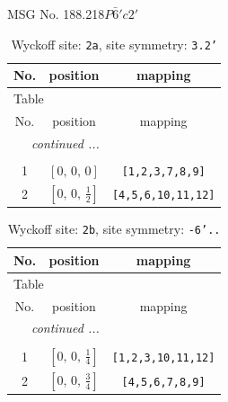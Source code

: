 \documentclass[fleqn,8pt]{jsarticle}
\begin{document}
\setcounter{MaxMatrixCols}{32}

\renewcommand{\tablename}{Table~}
\renewcommand{\figurename}{Figure~}
\begin{center}
\LARGE
MSG No. 188.218\quad$P\bar{6}'c2'$
\end{center}
\renewcommand{\arraystretch}{1.2}
\begin{longtable}{ccc}
\caption{Wyckoff site: {\tt 2a}, site symmetry: {\tt 3.2'}}
 \\
 \hline \hline
No. & position & mapping \\ \hline \endfirsthead

\multicolumn{2}{l}{\tablename\ \thetable{}} \\
 \hline \hline
No. & position & mapping \\ \hline \endhead

 \hline \hline
\multicolumn{2}{r}{\footnotesize\it continued ...} \\ \endfoot

 \hline \hline
\multicolumn{2}{r}{} \\ \endlastfoot

1 & $\left[ 0,\, 0,\, 0 \right]$ & {\tt [1,2,3,7,8,9]} \\ \hline
2 & $\left[ 0,\, 0,\, \frac{1}{2} \right]$ & {\tt [4,5,6,10,11,12]} \\
\end{longtable}
\renewcommand{\arraystretch}{1.2}
\begin{longtable}{ccc}
\caption{Wyckoff site: {\tt 2b}, site symmetry: {\tt -6'..}}
 \\
 \hline \hline
No. & position & mapping \\ \hline \endfirsthead

\multicolumn{2}{l}{\tablename\ \thetable{}} \\
 \hline \hline
No. & position & mapping \\ \hline \endhead

 \hline \hline
\multicolumn{2}{r}{\footnotesize\it continued ...} \\ \endfoot

 \hline \hline
\multicolumn{2}{r}{} \\ \endlastfoot

1 & $\left[ 0,\, 0,\, \frac{1}{4} \right]$ & {\tt [1,2,3,10,11,12]} \\ \hline
2 & $\left[ 0,\, 0,\, \frac{3}{4} \right]$ & {\tt [4,5,6,7,8,9]} \\
\end{longtable}
\end{document}
